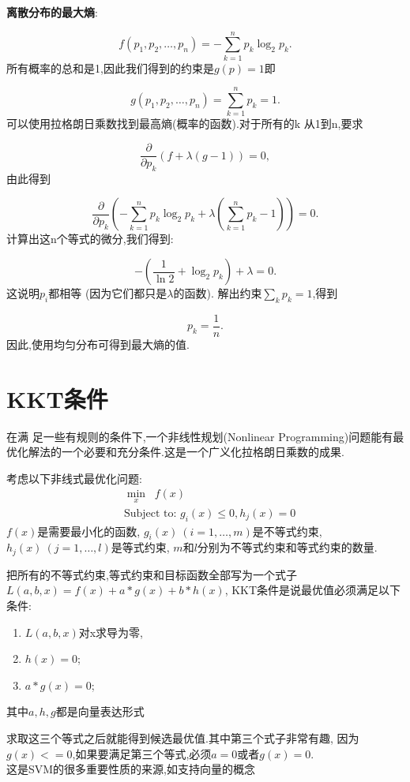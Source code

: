 \documentclass{article}
\begin{document}
\begin{example}
\textbf{离散分布的最大熵}:

$$ f(p_1,p_2,\ldots,p_n) = -\sum_{k=1}^n p_k\log_2 p_k.  $$
所有概率的总和是1,因此我们得到的约束是$g(p)= 1$即

$$ g(p_1,p_2,\ldots,p_n)=\sum_{k=1}^n p_k=1.  $$
可以使用拉格朗日乘数找到最高熵(概率的函数).对于所有的k 从1到n,要求

$$ \frac{\partial}{\partial p_k}(f+\lambda (g-1))=0, $$
由此得到

$$ \frac{\partial}{\partial p_k}\left(-\sum_{k=1}^n p_k \log_2 p_k + \lambda (\sum_{k=1}^n p_k - 1) \right) = 0.  $$
计算出这n个等式的微分,我们得到:

$$ -\left(\frac{1}{\ln 2}+\log_2 p_k \right) + \lambda = 0.  $$
这说明$p_i$都相等 (因为它们都只是$\lambda$的函数). 解出约束$\sum_k p_k = 1$,得到

$$ p_k = \frac{1}{n}.$$
因此,使用均匀分布可得到最大熵的值.
\end{example}

\section{KKT条件}
在满 足一些有规则的条件下,一个非线性规划(Nonlinear Programming)问题能有最优化解法的一个必要和充分条件.这是一个广义化拉格朗日乘数的成果.

考虑以下非线式最优化问题:
$$
\begin{aligned}
& \min\limits_{x}\;\; f(x) \\
& \mbox{Subject to: } g_i(x) \le 0 , h_j(x) = 0
\end{aligned}
$$
$f(x)$是需要最小化的函数,
$g_i (x)\ (i = 1, \ldots,m)$是不等式约束,
$h_j (x)\ (j = 1,\ldots,l)$是等式约束,
$m$和$l$分别为不等式约束和等式约束的数量.

把所有的不等式约束,等式约束和目标函数全部写为一个式子
$L(a, b, x)= f(x) + a*g(x)+b*h(x)$,
KKT条件是说最优值必须满足以下条件:

\begin{enumerate}
\item $L(a, b, x)$对x求导为零,
\item $h(x) =0$;
\item $a*g(x) = 0$;
\end{enumerate}
其中$a, h, g$都是向量表达形式

求取这三个等式之后就能得到候选最优值.其中第三个式子非常有趣, 因为
$g(x)<=0$,如果要满足第三个等式,必须$a=0$或者$g(x)=0$.\\
这是SVM的很多重要性质的来源,如支持向量的概念
\end{document}
